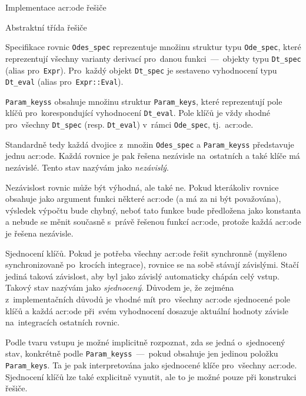 \documentclass[thesis=M,czech]{FITthesis}[2012/06/26]
\newcommand{\acrlabel}[1]{acr:#1}
\newcommand{\acr}[1]{\acrshort{\acrlabel{#1}}}
\newcommand{\id}[1]{\texttt{#1}}
\newcommand{\hl}[1]{\textit{#1}}
\newcommand{\name}[1]{\hl{#1}}
\begin{document}
\begin{section}{Implementace \acr{ode} řešiče}
\begin{subsection}{Abstraktní třída řešiče}
\begin{subsubsection}{Specifikace rovnic}
\id{Odes\_\-spec} reprezentuje množinu
struktur typu \id{Ode\_\-spec},
které reprezentují všechny varianty derivací
pro~danou funkci~---~objekty typu \id{Dt\_\-spec}
(alias pro~\id{Expr}).
Pro~každý objekt \id{Dt\_\-spec}
je sestaveno vyhodnocení typu \id{Dt\_\-eval}
(alias pro~\id{Expr::\-Eval}).

\id{Param\_\-keyss} obsahuje množinu
struktur \id{Param\_\-keys},
které reprezentují pole klíčů
pro~korespondující vyhodnocení \id{Dt\_\-eval}.
Pole klíčů je vždy shodné pro~všechny \id{Dt\_\-spec}
(resp. \id{Dt\_\-eval})
v~rámci \id{Ode\_\-spec}, tj.~\acr{ode}.

Standardně tedy každá dvojice z~množin
\id{Odes\_\-spec} a \id{Param\_\-keyss}
představuje jednu \acr{ode}.
Každá rovnice je pak řešena nezávisle na~ostatních
a také klíče má nezávislé.
Tento stav nazývám jako \name{nezávislý}.

Nezávislost rovnic může být výhodná, ale také ne.
Pokud kterákoliv rovnice obsahuje jako argument
funkci některé \acr{ode}
(a má za ni být považována),
výsledek výpočtu bude chybný,
neboť tato funkce bude předložena jako konstanta
a nebude se měnit současně s~právě řešenou funkcí \acr{ode},
protože každá \acr{ode} je řešena nezávisle.


\begin{paragraph}{Sjednocení klíčů.}\label{p:impl:ode:solver:spec:unif}
Pokud je potřeba všechny \acr{ode} řešit synchronně
(myšleno synchronizovaně po~krocích integrace),
rovnice se na sobě stávají závislými.
Stačí jediná taková závislost,
aby byl jako závislý automaticky chápán celý vstup.
Takový stav nazývám jako \name{sjednocený}.
Důvodem je, že zejména z~implementačních důvodů
je vhodné mít pro~všechny \acr{ode}
sjednocené pole klíčů
a každá \acr{ode} při~svém vyhodnocení
dosazuje aktuální hodnoty závisle
na~integracích ostatních rovnic.

Podle tvaru vstupu je možné implicitně rozpoznat,
zda se jedná o~sjednocený stav,
konkrétně podle \id{Param\_\-keyss}~---~pokud obsahuje
jen jedinou položku \id{Param\_\-keys}.
Ta je pak interpretována jako sjednocené klíče
pro~všechny \acr{ode}.
Sjednocení klíčů lze také explicitně vynutit,
ale to je možné pouze při konstrukci řešiče.
\end{paragraph} %


\bigskip


\end{subsubsection}
\end{subsection}
\end{section}
\end{document}
